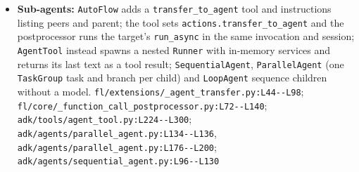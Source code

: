 \begin{itemize}
\item \textbf{Sub-agents:} \texttt{AutoFlow} adds a \texttt{transfer\_\allowbreak{}to\_\allowbreak{}agent} tool and instructions listing peers and parent; the tool sets \texttt{actions.\allowbreak{}transfer\_\allowbreak{}to\_\allowbreak{}agent} and the postprocessor runs the target's \texttt{run\_\allowbreak{}async} in the same invocation and session; \texttt{AgentTool} instead spawns a nested \texttt{Runner} with in-memory services and returns its last text as a tool result; \texttt{SequentialAgent}, \texttt{ParallelAgent} (one \texttt{TaskGroup} task and branch per child) and \texttt{LoopAgent} sequence children without a model. \texttt{fl/\allowbreak{}extensions/\allowbreak{}\_\allowbreak{}agent\_\allowbreak{}transfer.\allowbreak{}py:\allowbreak{}L44-\allowbreak{}-\allowbreak{}L98}; \texttt{fl/\allowbreak{}core/\allowbreak{}\_\allowbreak{}function\_\allowbreak{}call\_\allowbreak{}postprocessor.\allowbreak{}py:\allowbreak{}L72-\allowbreak{}-\allowbreak{}L140}; \texttt{adk/\allowbreak{}tools/\allowbreak{}agent\_\allowbreak{}tool.\allowbreak{}py:\allowbreak{}L224-\allowbreak{}-\allowbreak{}L300}; \texttt{adk/\allowbreak{}agents/\allowbreak{}parallel\_\allowbreak{}agent.\allowbreak{}py:\allowbreak{}L134-\allowbreak{}-\allowbreak{}L136}, \texttt{adk/\allowbreak{}agents/\allowbreak{}parallel\_\allowbreak{}agent.\allowbreak{}py:\allowbreak{}L176-\allowbreak{}-\allowbreak{}L200}; \texttt{adk/\allowbreak{}agents/\allowbreak{}sequential\_\allowbreak{}agent.\allowbreak{}py:\allowbreak{}L96-\allowbreak{}-\allowbreak{}L130}
\end{itemize}

